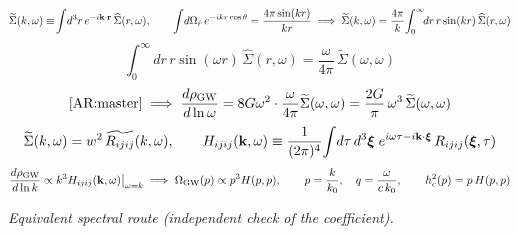 \documentclass[10pt,prd,aps,nobibnotes,superscriptaddress,preprintnumbers,notitlepage]{revtex4-1}
\newcommand{\Omgw}{\Omega_{\rm GW}}
\newcommand{\rhat}{\hat{r}}
\newcommand{\br}{{\bf r}}
\newcommand{\kb}{{\bf k}}
\newcommand{\bxi}{{\boldsymbol{\xi}}}
\begin{document}
\begin{equation}
  \widetilde\Sigma(k,\omega)\equiv\!\int\!d^3r\,e^{-i\kb\cdot\br}\,\widehat\Sigma(r,\omega),
  \qquad
  \int\!d\Omega_{\rhat}\,e^{-ikr\cos\theta}=\frac{4\pi\sin(kr)}{kr}
  \;\Longrightarrow\;
  \widetilde\Sigma(k,\omega)=\frac{4\pi}{k}\!\int_0^{\infty}\!\!dr\,r\sin(kr)\,\widehat\Sigma(r,\omega)
  \label{A:bridge-ft}
\end{equation}
\begin{equation}
  \int_0^{\infty}\!\!dr\,r\sin(\omega r)\,\widehat\Sigma(r,\omega)
  =\frac{\omega}{4\pi}\,\widetilde\Sigma(\omega,\omega)
  \label{A:bridge-radial}
\end{equation}
\begin{equation}
  \eqref{AR:master}
  \;\Longrightarrow\;
  \frac{d\rho_{\rm GW}}{d\ln\omega}
  =8G\omega^2\cdot\frac{\omega}{4\pi}\widetilde\Sigma(\omega,\omega)
  =\frac{2G}{\pi}\,\omega^3\,\widetilde\Sigma(\omega,\omega)
  \label{A:bridge-master}
\end{equation}
\begin{equation}
  \widetilde\Sigma(k,\omega)=w^2\,\widetilde{R_{ijij}}(k,\omega),
  \qquad
  H_{ijij}(\kb,\omega)\equiv\frac{1}{(2\pi)^4}\!\int\!d\tau\,d^3\bxi\;
  e^{i\omega\tau-i\kb\cdot\bxi}\,R_{ijij}(\bxi,\tau)
  \label{A:bridge-H}
\end{equation}
\begin{equation}
  \frac{d\rho_{\rm GW}}{d\ln k}\propto k^3H_{ijij}(\kb,\omega)\big|_{\omega=k}
  \;\Longrightarrow\;
  \Omgw(p)\propto p^3H(p,p),
  \qquad p=\frac{k}{k_0},\quad q=\frac{\omega}{c\,k_0},
  \qquad h_c^2(p)=p\,H(p,p)
  \label{A:diagonal}
\end{equation}

\medskip
\noindent\emph{Equivalent spectral route (independent check of the coefficient).}
\end{document}
